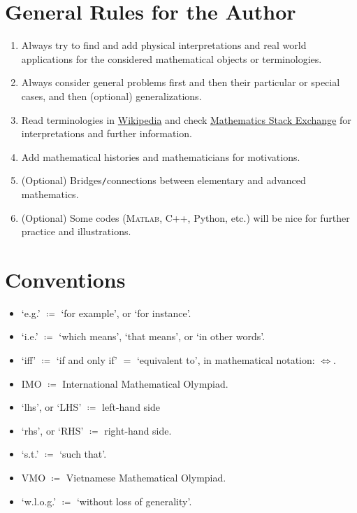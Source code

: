 \documentclass[oneside]{book}
\numberwithin{equation}{section}
\begin{document}
\section*{General Rules for the Author}
\begin{enumerate}
	\item Always try to find and add physical interpretations and real world applications for the considered mathematical objects or terminologies.
	\item Always consider general problems first and then their particular or special cases, and then (optional) generalizations.
	\item Read terminologies in \href{https://www.wikipedia.org/}{Wikipedia} and check \href{https://math.stackexchange.com/}{Mathematics Stack Exchange} for interpretations and further information.
	\item Add mathematical histories and mathematicians for motivations.
	\item (Optional) Bridges\texttt{/}connections between elementary and advanced mathematics.
	\item (Optional) Some codes (\textsc{Matlab}, C++, Python, etc.) will be nice for further practice and illustrations.
\end{enumerate}

\section*{Conventions}
\begin{itemize}
	\item `e.g.' $\coloneqq$ `for example', or `for instance'.
	\item `i.e.' $\coloneqq$ `which means', `that means', or `in other words'.
	\item `iff' $\coloneqq$ `if and only if' $=$ `equivalent to', in mathematical notation: $\Leftrightarrow$.
	\item IMO $\coloneqq$ International Mathematical Olympiad.
	\item `lhs', or `LHS' $\coloneqq$ left-hand side
	\item `rhs', or `RHS' $\coloneqq$ right-hand side.
	\item `s.t.' $\coloneqq$ `such that'.
	\item VMO $\coloneqq$ Vietnamese Mathematical Olympiad.
	\item `w.l.o.g.' $\coloneqq$ `without loss of generality'.
\end{itemize}
\end{document}
